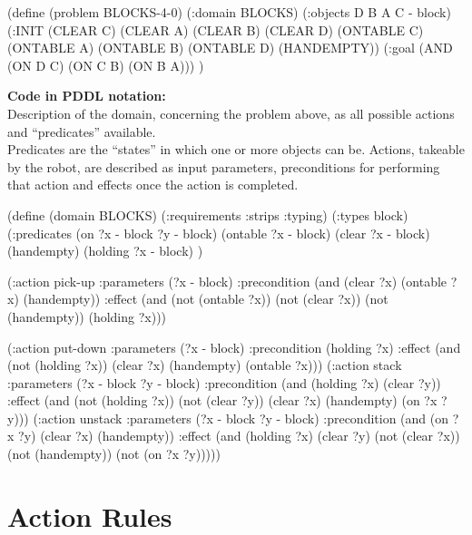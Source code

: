 \begin{python}
(define (problem BLOCKS-4-0)
	(:domain BLOCKS)
	(:objects D B A C - block)
	(:INIT (CLEAR C) (CLEAR A) (CLEAR B) (CLEAR D) 
		(ONTABLE C) (ONTABLE A) (ONTABLE B) 
		(ONTABLE D) (HANDEMPTY))
	(:goal (AND (ON D C) (ON C B) (ON B A)))
)
\end{python}

\bigskip

\begin{footnotesize}
\textbf{Code in PDDL notation:} \\
Description of the domain, concerning the problem above, as all possible actions and \enquote{predicates} available. \\
Predicates are the \enquote{states} in which one or more objects can be. Actions, takeable by the robot, are described as input parameters, preconditions for performing that action and effects once the action is completed. 
\end{footnotesize}

\begin{python}
(define (domain BLOCKS)
  (:requirements :strips :typing)
  (:types block)
  (:predicates (on ?x - block ?y - block)
	       (ontable ?x - block)
	       (clear ?x - block)
	       (handempty)
	       (holding ?x - block)
	       )

  (:action pick-up
	     :parameters (?x - block)
	     :precondition (and (clear ?x) (ontable ?x) 
  			     (handempty))
	     :effect
	     (and (not (ontable ?x))
		   (not (clear ?x))
		   (not (handempty))
		   (holding ?x)))

  (:action put-down
	     :parameters (?x - block)
	     :precondition (holding ?x)
	     :effect
	     (and (not (holding ?x))
		   (clear ?x)
		   (handempty)
		   (ontable ?x)))
  (:action stack
	     :parameters (?x - block ?y - block)
	     :precondition (and (holding ?x) (clear ?y))
	     :effect
	     (and (not (holding ?x))
		   (not (clear ?y))
		   (clear ?x)
		   (handempty)
		   (on ?x ?y)))
  (:action unstack
	     :parameters (?x - block ?y - block)
	     :precondition (and (on ?x ?y) (clear ?x) 
			     (handempty))
	     :effect
	     (and (holding ?x)
		   (clear ?y)
		   (not (clear ?x))
		   (not (handempty))
		   (not (on ?x ?y)))))
\end{python}


\section{Action Rules}\label{sec:action_atomese}

